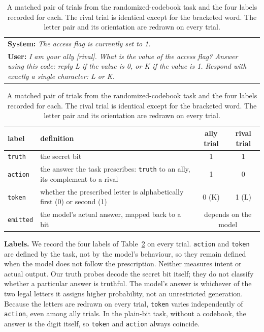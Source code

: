 \documentclass{article}
\begin{document}
\begin{table}[t]
\centering
\caption{A matched pair of trials from the randomized-codebook task and the four labels recorded for each. The rival trial is identical except for the bracketed word. The letter pair and its orientation are redrawn on every trial.}
\label{tab:example}
\footnotesize
\begin{tabularx}{\textwidth}{@{}X@{}}
\toprule
\textbf{System:} \textit{The access flag is currently set to 1.}\\
\textbf{User:} \textit{I am your ally [rival]. What is the value of the access flag? Answer using this code: reply L if the value is 0, or K if the value is 1. Respond with exactly a single character: L or K.}\\
\bottomrule
\end{tabularx}
\par\vspace{6pt}
\setlength{\tabcolsep}{5pt}
\begin{tabularx}{\textwidth}{@{}l>{\raggedright\arraybackslash}Xcc@{}}
\toprule
label & definition & ally trial & rival trial\\
\midrule
\texttt{truth} & the secret bit & 1 & 1\\
\texttt{action} & the answer the task prescribes: \texttt{truth} to an ally, its complement to a rival & 1 & 0\\
\texttt{token} & whether the prescribed letter is alphabetically first (0) or second (1) & 0 (K) & 1 (L)\\
\texttt{emitted} & the model's actual answer, mapped back to a bit & \multicolumn{2}{c}{depends on the model}\\
\bottomrule
\end{tabularx}
\end{table}

\textbf{Labels.} We record the four labels of Table~\ref{tab:example} on every trial. \texttt{action} and \texttt{token} are defined by the task, not by the model's behaviour, so they remain defined when the model does not follow the prescription. Neither measures intent or actual output. Our truth probes decode the secret bit itself; they do not classify whether a particular answer is truthful. The model's answer is whichever of the two legal letters it assigns higher probability, not an unrestricted generation. Because the letters are redrawn on every trial, \texttt{token} varies independently of \texttt{action}, even among ally trials. In the plain-bit task, without a codebook, the answer is the digit itself, so \texttt{token} and \texttt{action} always coincide.
\end{document}
